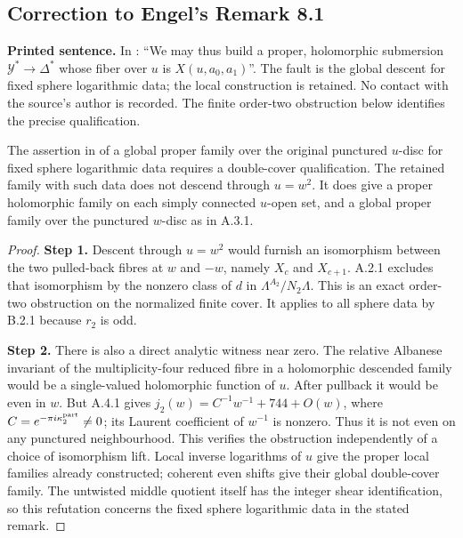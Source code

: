 \subsection{Correction to Engel's Remark 8.1}
\noindent\textbf{Printed sentence.} In \cite[Remark 8.1]{E26}: ``We may thus build a proper, holomorphic submersion $\mathcal Y^*\to\Delta^*$ whose fiber over $u$ is $X(u,a_0,a_1)$''. The fault is the global descent for fixed sphere logarithmic data; the local construction is retained. No contact with the source's author is recorded. The finite order-two obstruction below identifies the precise qualification.
\begin{proposition}[FAM B.2.3; T]\label{fam:B.2.3}
The assertion in \cite[Remark 8.1]{E26} of a global proper family over the original punctured $u$-disc for fixed sphere logarithmic data requires a double-cover qualification. The retained family with such data does not descend through $u=w^2$. It does give a proper holomorphic family on each simply connected $u$-open set, and a global proper family over the punctured $w$-disc as in A.3.1.
\end{proposition}
\begin{proof}
\par\smallskip\noindent\textbf{Step 1.} Descent through $u=w^2$ would furnish an isomorphism between the two pulled-back fibres at $w$ and $-w$, namely $X_c$ and $X_{c+1}$. A.2.1 excludes that isomorphism by the nonzero class of $d$ in $\Lambda^{A_2}/N_2\Lambda$. This is an exact order-two obstruction on the normalized finite cover. It applies to all sphere data by B.2.1 because $r_2$ is odd.

\par\smallskip\noindent\textbf{Step 2.} There is also a direct analytic witness near zero. The relative Albanese invariant of the multiplicity-four reduced fibre in a holomorphic descended family would be a single-valued holomorphic function of $u$. After pullback it would be even in $w$. But A.4.1 gives $j_2(w)=C^{-1}w^{-1}+744+O(w)$, where $C=e^{-\pi i\kappa_2^{\rm part}}\ne0$; its Laurent coefficient of $w^{-1}$ is nonzero. Thus it is not even on any punctured neighbourhood. This verifies the obstruction independently of a choice of isomorphism lift. Local inverse logarithms of $u$ give the proper local families already constructed; coherent even shifts give their global double-cover family. The untwisted middle quotient itself has the integer shear identification, so this refutation concerns the fixed sphere logarithmic data in the stated remark.
\end{proof}

